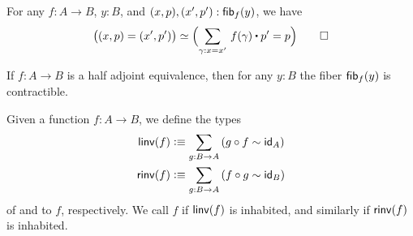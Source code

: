 \documentclass[hott-all.tex]{subfiles}
\begin{document}
\begin{lem}\label{lem:hfib}
  For any $f : A \to B$, $y : B$, and $(x,p),(x',p') : {\mathsf{fib}}_{f}(y)$, we have
  \[ \big((x,p) = (x',p')\big) \eqvsym \Parens{\sm{\gamma : x = x'} f(\gamma) \ct p' = p} \qedhere\]
\end{lem}

\begin{thm}\label{thm:contr-hae}
  If $f:A\to B$ is a half adjoint equivalence, then for any $y:B$ the fiber ${\mathsf{fib}}_{f}(y)$ is contractible.
\end{thm}
%

\begin{defn}\label{defn:linv-rinv}
  Given a function $f:A\to B$, we define the types
    \begin{align*}
      \linv(f) &\defeq \sm{g:B\to A} (g\circ f\htpy \idfunc[A])\\
      \rinv(f) &\defeq \sm{g:B\to A} (f\circ g\htpy \idfunc[B])
    \end{align*}
  of 
  and 
  to $f$, respectively.
  We call $f$ 
  if $\mathsf{linv}(f)$ is inhabited, and similarly 
  if $\mathsf{rinv}(f)$ is inhabited.
\end{defn}
\end{document}
